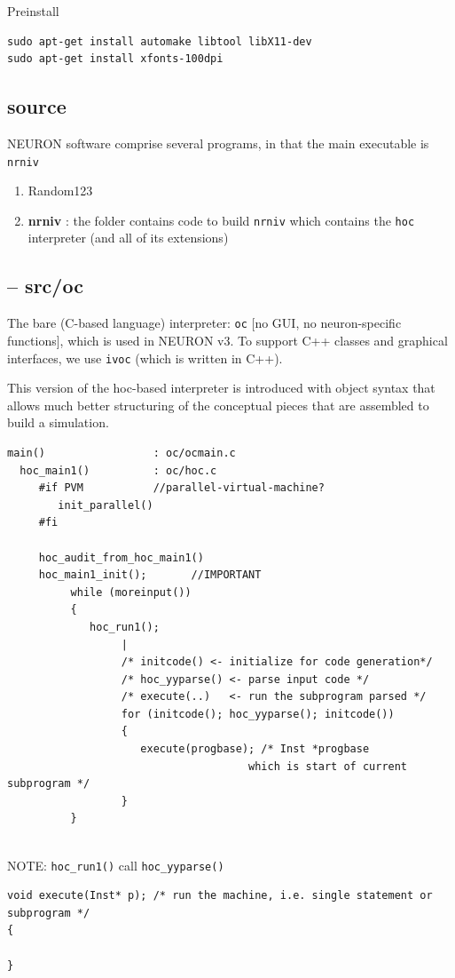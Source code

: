 Preinstall
\begin{verbatim}
sudo apt-get install automake libtool libX11-dev 
sudo apt-get install xfonts-100dpi

\end{verbatim}

\subsection{source}

NEURON software comprise several programs, in that the main executable is
\verb!nrniv! 

\begin{enumerate}
  \item Random123
  
  \item {\bf nrniv} : the folder contains code to build \verb!nrniv! which
  contains the \verb!hoc! interpreter (and all of its extensions)
  
  
\end{enumerate}

\subsection{-- src/oc}
\label{sec:oc-interpreter}

The bare (C-based language) interpreter: \verb!oc! [no GUI, no neuron-specific
functions], which is used in NEURON v3. To support C++ classes and graphical
interfaces, we use \verb!ivoc! (which is written in C++).
 
This version of the hoc-based interpreter is introduced with object syntax that
allows much better structuring of the conceptual pieces that are assembled to
build a simulation.
 
\begin{verbatim}
main()                 : oc/ocmain.c
  hoc_main1()          : oc/hoc.c
     #if PVM           //parallel-virtual-machine?
        init_parallel()
     #fi
     
     hoc_audit_from_hoc_main1()
     hoc_main1_init();       //IMPORTANT
          while (moreinput())
          {
             hoc_run1();
                  |
                  /* initcode() <- initialize for code generation*/
                  /* hoc_yyparse() <- parse input code */
                  /* execute(..)   <- run the subprogram parsed */
                  for (initcode(); hoc_yyparse(); initcode())
                  {
                     execute(progbase); /* Inst *progbase 
                                      which is start of current subprogram */
                  }
          }     
     
\end{verbatim}
NOTE: \verb!hoc_run1()! call \verb!hoc_yyparse()!
\begin{verbatim}
void execute(Inst* p); /* run the machine, i.e. single statement or subprogram */
{
  
}
\end{verbatim}

